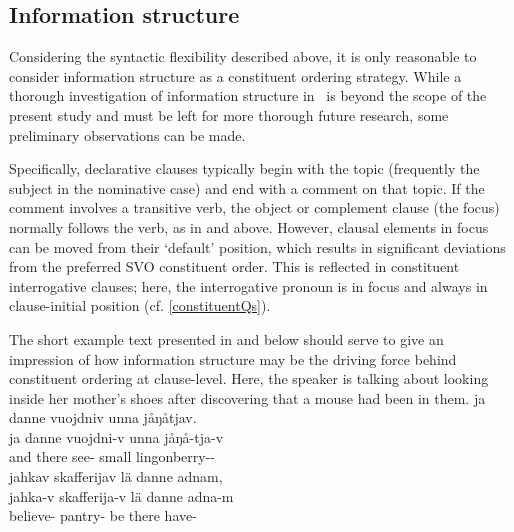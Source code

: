 \subsection{Information structure}\label{infoStructure}
Considering the syntactic flexibility described above, it is only reasonable to consider information structure as a constituent ordering strategy. 
While a thorough investigation of information structure in \PS\ is beyond the scope of the present study %
and must be left for more thorough future research, some preliminary observations can be made. %

Specifically, declarative clauses typically begin with the topic (frequently the subject in the nominative case) and end with a comment on that topic. If the comment involves a transitive verb, the object or complement clause (the focus) normally follows the verb, as in  and  above. However, clausal elements in focus can be moved from their ‘default’ position, which results in significant deviations from the %
preferred SVO constituent order. This is reflected in constituent interrogative clauses; here, the interrogative pronoun is in focus and always in clause-initial position %
(cf. \SEC\ref{constituentQs}).

The short example text presented in  and  below should serve to give an impression of how information structure may be the driving force behind constituent ordering at clause-level. Here, the speaker is talking about looking inside her mother’s shoes after discovering that a mouse had been in them.
\ea\label{mouseText4}%
\glll	ja danne vuojdniv unna jåŋåtjav.\\
	ja danne vuojdni-v unna jåŋå-tja-v\\
	and there see- small lingonberry--\\\nopagebreak
{}	
\ex\label{mouseText5}%
\glll	jahkav skafferijav lä danne adnam,\\
	jahka-v skafferija-v lä danne adna-m\\
	believe- pantry- be\BS{} there have-\\\nopagebreak
{}	
\z

